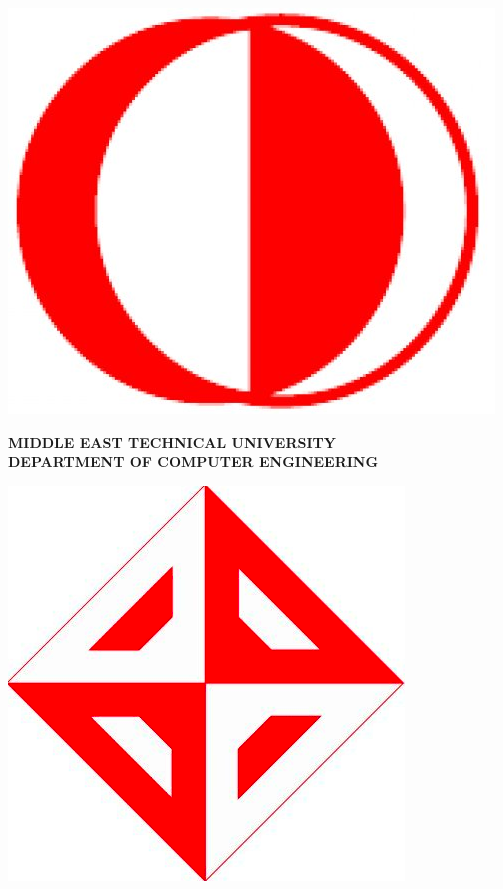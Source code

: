 \documentclass[11pt,a4paper]{article}
\theoremstyle{definition}
\begin{document}
	\begin{titlepage}
		\begin{minipage}{.10\textwidth}
			\includegraphics[width=\textwidth]{images/left_logo.png}
		\end{minipage}%
		\begin{minipage}{.80\textwidth}
			\centering
			\Large
			\textbf{MIDDLE EAST TECHNICAL UNIVERSITY \\DEPARTMENT OF COMPUTER ENGINEERING}
		\end{minipage}%
		\begin{minipage}{.10\textwidth}
			\includegraphics[width=\textwidth]{images/right_logo.png}
		\end{minipage}%
		\vspace{2cm}
		

\end{titlepage}
\end{document}
